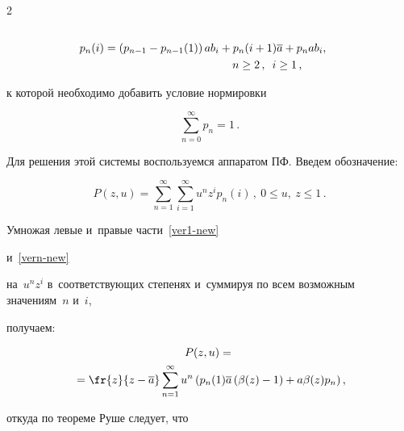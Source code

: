 \begin{multicols}{2}
\begin{align}
\\

\!p_n(i) &=

\left(p_{n-1}-p_{n-1}(1)\right) a b_i +

p_{n}(i+1) \overline{a} + p_{n} a b_i,\notag\\

& \hspace*{40mm}n \ge 2\,, \enskip i \ge 1\,,

\label{vern-new}

\end{align}

к которой необходимо добавить условие нор\-ми\-ровки



\vspace*{-2pt}



\noindent

$$

\sum\limits_{n=0}^\infty p_n =1\,.

$$

Для решения этой системы воспользуемся аппаратом ПФ. Введем обозначение:

$$

P(z,u) = \sum\limits_{n=1}^{\infty}  \sum\limits_{i=1}^{\infty} u^n z^i p_n(i)\,,\

0\le u,\ z\le 1\,.

$$

 Умножая левые и~правые части~\eqref{ver1-new} 

и~\eqref{vern-new}

на~$u^nz^i$ в~соответствующих степенях и~суммируя по всем возможным значениям~$n$ и~$i$,

получаем:

\begin{multline}

P(z,u)= {}\\

{}=\fr{z}{z-\overline{a}}

\sum\limits_{n=1}^{\infty}  u^n \left (

p_n(1)\overline{a} \left( \beta(z) -1\right)

+a \beta(z) p_n

\right ), 

\label{eq_Pzu}

\end{multline}

откуда по теореме Руше следует, что

$$


\end{multicols}
